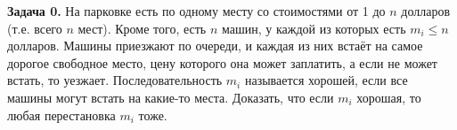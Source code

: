 \documentclass[12pt,a4paper]{article}
\begin{document}

\textbf{Задача 0.} На парковке есть по одному месту со стоимостями от 1 до $n$ долларов (т.е. всего $n$ мест). Кроме того, есть $n$ машин, у каждой из которых есть $m_i\leq n$ долларов. Машины приезжают по очереди, и каждая из них встаёт на самое дорогое свободное место, цену которого она может заплатить, а если не может встать, то уезжает. Последовательность $m_i$ называется хорошей, если все машины могут встать на какие-то места. Доказать, что если $m_i$ хорошая, то любая перестановка $m_i$ тоже.

\end{document}
